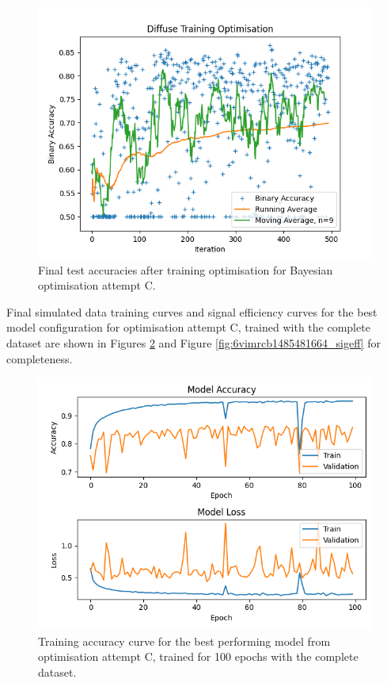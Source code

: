 \begin{figure}[] 
        \centering \includegraphics[width=\columnwidth]{figures/convplot_longmoredata.png}

        \caption{
                \label{fig:convplot_longmoredata} Final test accuracies after training optimisation for Bayesian optimisation attempt C.
        }
\end{figure}

Final simulated data training curves and signal efficiency curves for the best model configuration for optimisation attempt C, trained with the complete dataset are shown in Figures \ref{fig:6vimrcb1485481664_trainlog} and Figure \ref{fig:6vimrcb1485481664_sigeff} for completeness. 

\begin{figure}[] 
        \centering \includegraphics[width=\columnwidth]{figures/6vimrcb1485481664trainlog.png}

        \caption{
                \label{fig:6vimrcb1485481664_trainlog} Training accuracy curve for the best performing model from optimisation attempt C, trained for 100 epochs with the complete dataset.
        }
\end{figure}

